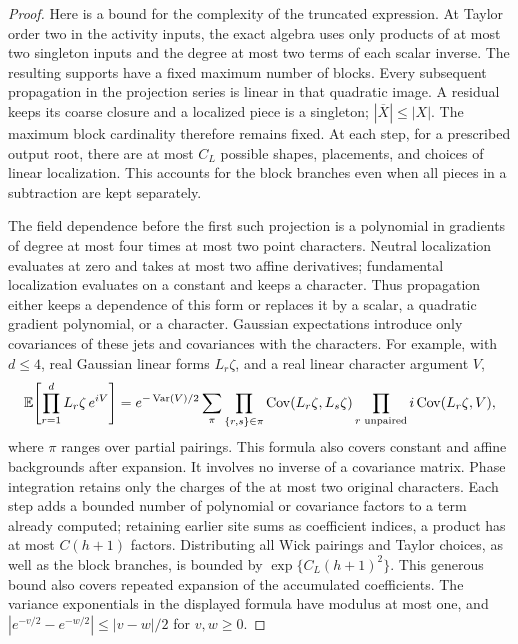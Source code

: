 \begin{proof}
Here is a bound for the complexity of the truncated expression.
At Taylor order two in the activity inputs, the exact algebra
\cite[Proposition~4.8]{B} uses only products of at most two singleton
inputs and the degree at most two terms of each scalar inverse.
The resulting supports have a fixed maximum number of blocks.  Every
subsequent propagation in the projection series is linear in that
quadratic image.  A residual keeps its coarse closure and a localized
piece is a singleton; \(|\overline X|\le |X|\).  The maximum block
cardinality therefore remains fixed.  At each step, for a prescribed
output root, there are at most \(C_L\) possible shapes, placements,
and choices of linear localization.  This accounts for the block
branches even when all pieces in a subtraction are kept separately.

The field dependence before the first such projection is a polynomial
in gradients of degree at most four times at most two point characters.
Neutral localization evaluates at zero and takes at most two affine
derivatives; fundamental localization evaluates on a constant and
keeps a character.  Thus propagation either keeps a dependence of
this form or replaces it by a scalar, a quadratic gradient polynomial,
or a character.  Gaussian expectations introduce only covariances of
these jets and covariances with the characters.  For example, with
\(d\le4\), real Gaussian linear forms \(L_r\zeta\), and a real linear
character argument \(V\),
\[
 \mathbb E\!\left[\prod_{r=1}^d L_r\zeta\,e^{iV}\right]
 =e^{-\operatorname{Var}(V)/2}
   \sum_{\pi}
    \prod_{\{r,s\}\in\pi}\operatorname{Cov}(L_r\zeta,L_s\zeta)
    \prod_{r\text{ unpaired}} i\operatorname{Cov}(L_r\zeta,V),
\]
where \(\pi\) ranges over partial pairings.  This formula also covers
constant and affine backgrounds after expansion.  It involves no
inverse of a covariance matrix.  Phase integration retains only the
charges of the at most two original characters.  Each step adds a
bounded number of polynomial or covariance factors to a term already
computed; retaining earlier site sums as coefficient indices, a product
has at most \(C(h+1)\) factors.  Distributing all Wick pairings and
Taylor choices, as well as the block branches, is bounded by
\(\exp\{C_L(h+1)^2\}\).  This generous bound also covers repeated
expansion of the accumulated coefficients.  The variance exponentials
in the displayed formula have modulus at most one, and
\(|e^{-v/2}-e^{-w/2}|\le |v-w|/2\) for \(v,w\ge0\).


\end{proof}
